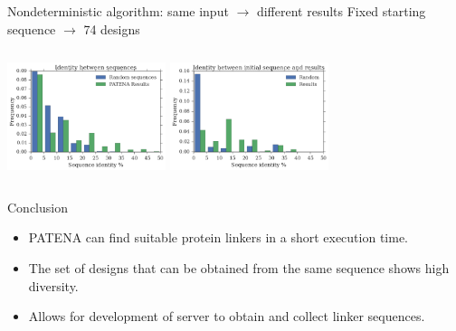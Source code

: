 \documentclass{beamer}
\begin{document}
\begin{frame}[plain]{Nondeterministic algorithm: same input $\rightarrow$ different results}
\centering
Fixed starting sequence $\rightarrow$ 74 designs\\
\vspace{15px}
\begin{adjustwidth}{-2.5em}{-2.5em}
\includegraphics[width=175px,height=145px]{../img/againstAll-random.png}
\includegraphics[width=175px,height=145px]{../img/againstInitial-random.png}
\end{adjustwidth}
\end{frame}



\begin{frame}{Conclusion}
\begin{itemize}
 \item PATENA can find suitable protein linkers in a short execution time.
 \item The set of designs that can be obtained from the same sequence shows high diversity. 
 \item Allows for development of server to obtain and collect linker sequences.
\end{itemize}
\end{frame}
\end{document}

